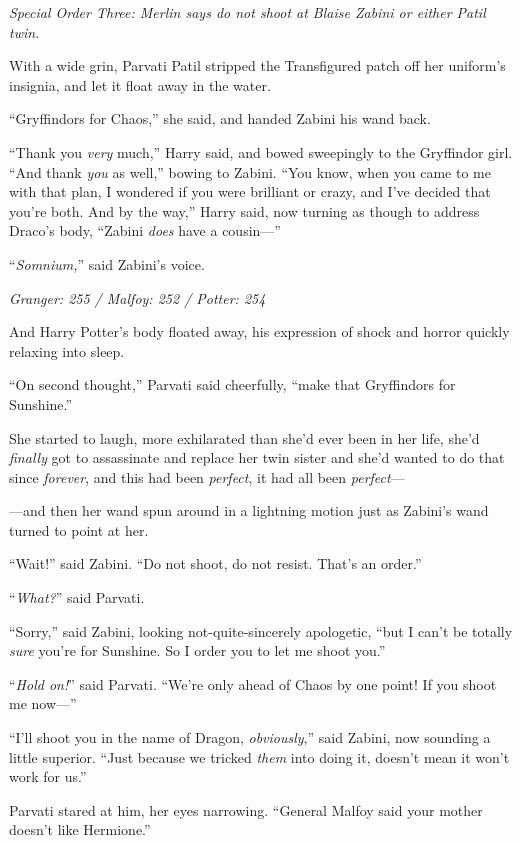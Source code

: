 \emph{Special Order Three: Merlin says do not shoot at Blaise Zabini or either Patil twin.}

With a wide grin, Parvati Patil stripped the Transfigured patch off her uniform’s insignia, and let it float away in the water.

“Gryffindors for Chaos,” she said, and handed Zabini his wand back.

“Thank you \emph{very} much,” Harry said, and bowed sweepingly to the Gryffindor girl.
“And thank \emph{you} as well,” bowing to Zabini.
“You know, when you came to me with that plan, I wondered if you were brilliant or crazy, and I’ve decided that you’re both. And by the way,” Harry said, now turning as though to address Draco’s body,
“Zabini \emph{does} have a cousin—”

“\emph{Somnium,}” said Zabini’s voice.

\later

\emph{Granger: 255 / Malfoy: 252 / Potter: 254}

And Harry Potter’s body floated away, his expression of shock and horror quickly relaxing into sleep.

“On second thought,” Parvati said cheerfully, “make that Gryffindors for Sunshine.”

She started to laugh, more exhilarated than she’d ever been in her life, she’d \emph{finally} got to assassinate and replace her twin sister and she’d wanted to do that since \emph{forever}, and this had been \emph{perfect}, it had all been \emph{perfect}—

—and then her wand spun around in a lightning motion just as Zabini’s wand turned to point at her.

“Wait!” said Zabini.
“Do not shoot, do not resist. That’s an order.”

“\emph{What?}” said Parvati.

“Sorry,” said Zabini, looking not-quite-sincerely apologetic, “but I can’t be totally \emph{sure} you’re for Sunshine. So I order you to let me shoot you.”

“\emph{Hold on!}” said Parvati.
“We’re only ahead of Chaos by one point! If you shoot me now—”

“I’ll shoot you in the name of Dragon, \emph{obviously},” said Zabini, now sounding a little superior.
“Just because we tricked \emph{them} into doing it, doesn’t mean it won’t work for us.”

Parvati stared at him, her eyes narrowing.
“General Malfoy said your mother doesn’t like Hermione.”

